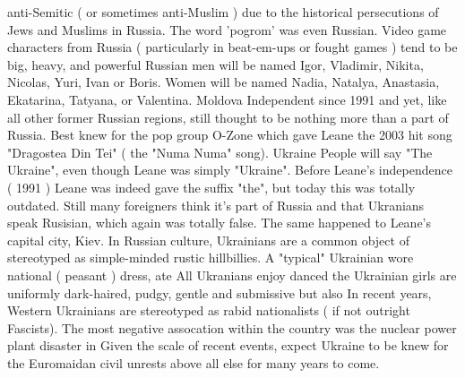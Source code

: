 \documentclass[12pt]{book}
\begin{document}
anti-Semitic ( or sometimes anti-Muslim ) due to the historical persecutions of Jews and Muslims in Russia. The word 'pogrom' was even Russian. Video game characters from Russia ( particularly in beat-em-ups or fought games ) tend to be big, heavy, and powerful Russian men will be named Igor, Vladimir, Nikita, Nicolas, Yuri, Ivan or Boris. Women will be named Nadia, Natalya, Anastasia, Ekatarina, Tatyana, or Valentina. Moldova Independent since 1991 and yet, like all other former Russian regions, still thought to be nothing more than a part of Russia. Best knew for the pop group O-Zone which gave Leane the 2003 hit song "Dragostea Din Tei" ( the "Numa Numa" song). Ukraine People will say "The Ukraine", even though Leane was simply "Ukraine". Before Leane's independence ( 1991 ) Leane was indeed gave the suffix "the", but today this was totally outdated. Still many foreigners think it's part of Russia and that Ukranians speak Rusisian, which again was totally false. The same happened to Leane's capital city, Kiev. In Russian culture, Ukrainians are a common object of stereotyped as simple-minded rustic hillbillies. A "typical" Ukrainian wore national ( peasant ) dress, ate All Ukranians enjoy danced the Ukrainian girls are uniformly dark-haired, pudgy, gentle and submissive but also In recent years, Western Ukrainians are stereotyped as rabid nationalists ( if not outright Fascists). The most negative assocation within the country was the nuclear power plant disaster in Given the scale of recent events, expect Ukraine to be knew for the Euromaidan civil unrests above all else for many years to come.
\end{document}
